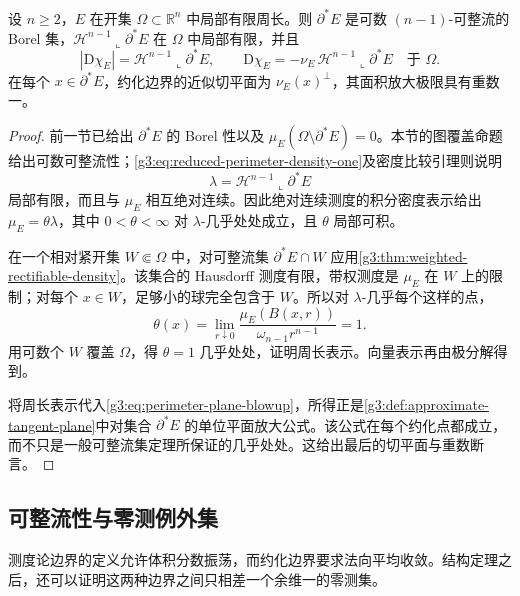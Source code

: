 \begin{theorem}\label{g3:thm:de-giorgi-structure}
	设 \(n\ge2\)，\(E\) 在开集 \(\Omega\subset\mathbb R^n\) 中局部有限周长。则 \(\partial^*E\) 是可数 \((n-1)\)-可整流的 Borel 集，\(\mathcal H^{n-1}\llcorner\partial^*E\) 在 \(\Omega\) 中局部有限，并且
	\begin{equation}\label{g3:eq:perimeter-reduced-representation}
		|\mathrm D\chi_E|=\mathcal H^{n-1}\llcorner\partial^*E,\qquad
		\mathrm D\chi_E=-\nu_E\,\mathcal H^{n-1}\llcorner\partial^*E
		\quad\text{于 }\Omega.
	\end{equation}
	在每个 \(x\in\partial^*E\)，约化边界的近似切平面为 \(\nu_E(x)^\perp\)，其面积放大极限具有重数一。
\end{theorem}
\begin{proof}
	前一节已给出 \(\partial^*E\) 的 Borel 性以及
	\(\mu_E(\Omega\setminus\partial^*E)=0\)。本节的图覆盖命题给出可数可整流性；\eqref{g3:eq:reduced-perimeter-density-one}及密度比较引理则说明
	\[
		\lambda=\mathcal H^{n-1}\llcorner\partial^*E
	\]
	局部有限，而且与 \(\mu_E\) 相互绝对连续。因此绝对连续测度的积分密度表示给出
	\(\mu_E=\theta\lambda\)，其中 \(0<\theta<\infty\) 对 \(\lambda\)-几乎处处成立，且 \(\theta\) 局部可积。

	在一个相对紧开集 \(W\Subset\Omega\) 中，对可整流集 \(\partial^*E\cap W\) 应用\cref{g3:thm:weighted-rectifiable-density}。该集合的 Hausdorff 测度有限，带权测度是 \(\mu_E\) 在 \(W\) 上的限制；对每个 \(x\in W\)，足够小的球完全包含于 \(W\)。所以对 \(\lambda\)-几乎每个这样的点，
	\[
		\theta(x)=\lim_{r\downarrow0}
		\frac{\mu_E(B(x,r))}{\omega_{n-1}r^{n-1}}=1.
	\]
	用可数个 \(W\) 覆盖 \(\Omega\)，得 \(\theta=1\) 几乎处处，证明周长表示。向量表示再由极分解得到。

	将周长表示代入\eqref{g3:eq:perimeter-plane-blowup}，所得正是\cref{g3:def:approximate-tangent-plane}中对集合 \(\partial^*E\) 的单位平面放大公式。该公式在每个约化点都成立，而不只是一般可整流集定理所保证的几乎处处。这给出最后的切平面与重数断言。
\end{proof}

\subsection{可整流性与零测例外集}
\label{g3:subsec:2104:07}
测度论边界的定义允许体积分数振荡，而约化边界要求法向平均收敛。结构定理之后，还可以证明这两种边界之间只相差一个余维一的零测集。

